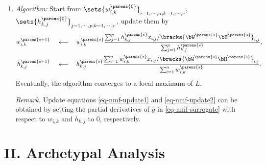\documentclass[12pt]{article}
\begin{document}
\begin{enumerate}[label=\textbf{\arabic*.}]
\begin{enumerate}
		\item \textit{Algorithm:} Start from $\sets{w_{i,k}^{\parens{0}}}_{i=1,\cdots,n; k=1,\cdots,r}$, $\sets{h_{k,j}^{\parens{0}}}_{j=1,\cdots,p; k=1,\cdots,r}$, update them by 
		\begin{align}
			w_{i,k}^{\parens{s+1}} \quad & \, \longleftarrow \quad w_{i,k}^{\parens{s}} \frac{\sum_{j=1}^p h_{k,j}^{\parens{s}} x_{i,j} / \bracks{\bW^{\parens{s}} \bH^{\parens{s}}}_{i,j}}{\sum_{j=1}^p h_{k,j}^{\parens{s}}}, \label{eq-nmf-update1} \\ 
			h_{k,j}^{\parens{s+1}} \quad & \, \longleftarrow \quad h_{k,j}^{\parens{s}} \frac{\sum_{i=1}^n w_{i,k}^{\parens{s}} x_{i,j} / \bracks{\bW^{\parens{s}} \bH^{\parens{s}}}_{i,j}}{\sum_{i=1}^n w_{i,k}^{\parens{s}}}. \label{eq-nmf-update2} 
		\end{align}
		Eventually, the algorithm converges to a local maximum of $L$. 
		
		\textit{Remark.} Update equations \eqref{eq-nmf-update1} and \eqref{eq-nmf-update2} can be obtained by setting the partial derivatives of $g$ in \eqref{eq-nmf-surrogate} with respect to $w_{i,k}$ and $h_{k,j}$ to 0, respectively. 
	\end{enumerate}

\end{enumerate}


\section*{II. Archetypal Analysis}
\end{document}
